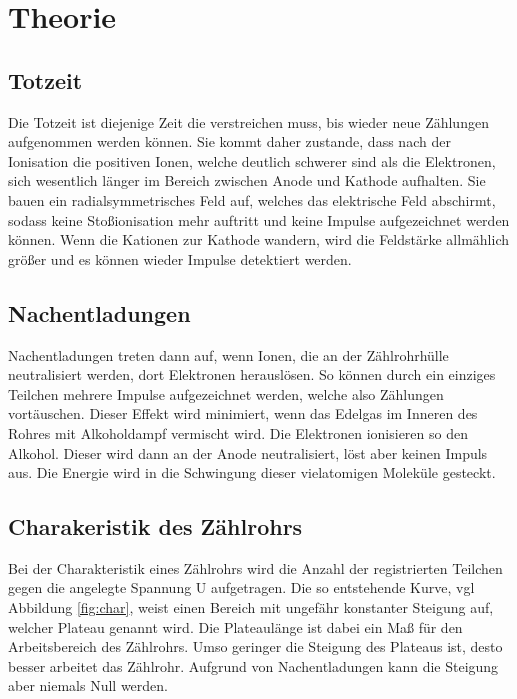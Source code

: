 \section{Theorie}
\label{sec:theorie}
\subsection{Totzeit}
Die Totzeit ist diejenige Zeit die verstreichen muss, bis wieder neue Zählungen
aufgenommen werden können.
Sie kommt daher zustande, dass nach der Ionisation die positiven Ionen, welche
deutlich schwerer sind als die Elektronen, sich wesentlich länger im Bereich
zwischen Anode und Kathode aufhalten. Sie bauen ein radialsymmetrisches Feld auf,
welches das elektrische Feld abschirmt, sodass keine Stoßionisation mehr
auftritt und keine Impulse aufgezeichnet werden können. Wenn die Kationen zur
Kathode wandern, wird die Feldstärke allmählich größer und es können wieder
Impulse detektiert werden.

\subsection{Nachentladungen}
Nachentladungen treten dann auf, wenn Ionen, die an der Zählrohrhülle
neutralisiert werden, dort Elektronen herauslösen. So können durch ein
einziges Teilchen mehrere Impulse aufgezeichnet werden, welche also Zählungen
vortäuschen. Dieser Effekt wird minimiert, wenn das Edelgas im Inneren des
Rohres mit Alkoholdampf vermischt wird. Die Elektronen ionisieren so den
Alkohol. Dieser wird dann an der Anode neutralisiert, löst aber keinen Impuls
aus. Die Energie wird in die Schwingung dieser vielatomigen Moleküle gesteckt.

\subsection{Charakeristik des Zählrohrs}
Bei der Charakteristik eines Zählrohrs wird die Anzahl der registrierten
Teilchen gegen die angelegte Spannung U aufgetragen.
Die so entstehende Kurve, vgl Abbildung \ref{fig:char},
weist einen Bereich mit ungefähr konstanter Steigung
auf, welcher Plateau genannt wird. Die Plateaulänge ist dabei ein Maß für den
Arbeitsbereich des Zählrohrs. Umso geringer die Steigung des Plateaus ist, desto
besser arbeitet das Zählrohr. Aufgrund von Nachentladungen kann die Steigung
aber niemals Null werden.

